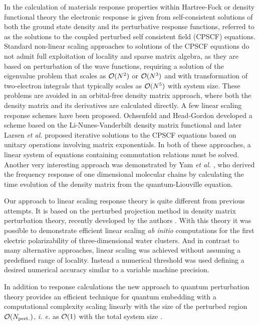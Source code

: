\documentclass[prl,aps,twocolumn,showpacs,twocolumngrid,superbib]{revtex4}
\begin{document}
 In the calculation of materials response properties within 
 Hartree-Fock or density functional theory the electronic
 response is given from self-consistent solutions of both
 the ground state density and its perturbative response functions,
 referred to as the solutions to the coupled perturbed self consistent 
 field (CPSCF) equations.
 Standard non-linear scaling approaches to solutions of the CPSCF equations 
 \cite{Pople_1979,Sekino_1986,Dupuis_1991} do not admit full exploitation 
 of locality and sparse matrix algebra, as they are based on perturbation 
 of the wave functions, requiring a solution of the eigenvalue problem
 that scales as ${\cal O}(N^2)$ or ${\cal O}(N^3)$ and with transformation of two-electron
 integrals that typically scales as ${\cal O}(N^5)$ with system size.
 These problems are avoided in an orbital-free density matrix approach, 
 where both the density matrix and its derivatives are calculated directly.
 A few linear scaling response schemes have been proposed.
 Ochsenfeld and Head-Gordon developed a scheme based on the
 Li-Nunes-Vanderbilt density matrix functional \cite{Ochsenfeld97}
 and later Larsen {\em et al.} \cite{Helgaker_2001} proposed iterative 
 solutions to the CPSCF equations based on unitary operations
 involving matrix exponentials. In both of these approaches, a linear 
 system of equations containing commutation relations must be solved.
 Another very interesting approach was demonstrated by Yam {\em et al.}
 \cite{CYam03,CYam03a}, who derived the frequency response of one 
 dimensional molecular chains by calculating the time evolution of 
 the density matrix from the quantum-Liouville equation.

 Our approach to linear scaling response theory is quite different 
 from previous attempts. It is based on the perturbed projection
 method in density matrix perturbation theory, recently developed
 by the authors \cite{ANiklasson04,Weber04}. With this theory it
 was possible to demonstrate efficient linear scaling {\em ab initio}
 computations for the first electric polarizability of three-dimensional 
 water clusters. And in contrast to many alternative approaches, linear scaling 
 was achieved without assuming a predefined range of locality. Instead a 
 numerical threshold was used defining a desired numerical accuracy similar
 to a variable machine precision.

 In addition to response calculations the new approach to quantum perturbation
 theory provides an efficient technique for quantum embedding with a computational
 complexity scaling linearly with the size of the perturbed region ${\cal O}(N_{\rm pert.})$,
 {\em i. e.} as ${\cal O}(1)$ with the total system size \cite{ANiklasson04}.
\end{document}
